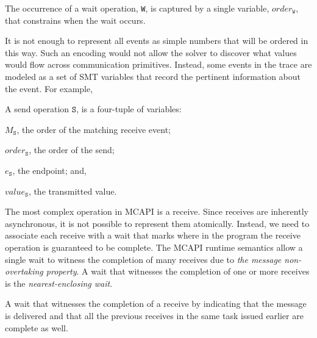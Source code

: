 \begin{definition}[Wait] \label{def:event}
The occurrence of a wait operation, \texttt{W}, is captured by a
single variable, $\mathit{order}_\mathtt{W}$, that constrains when
the wait occurs.
\end{definition}

It is not enough to represent all events as simple numbers
that will be ordered in this way.  Such an encoding would not allow the solver to
discover what values would flow across communication primitives. Instead, some events in the trace are modeled as a set of SMT
variables that record the pertinent information about the event. For
example,

\begin{definition}[Send] \label{def:snd}
A send operation $\mathtt{S}$, is a four-tuple of variables:
\begin{compactenum}
\item $M_\mathtt{S}$, the order of the matching receive event;

\item $\mathit{order}_\mathtt{S}$, the order of the send;

\item $e_\mathtt{S}$, the endpoint; and,

\item $\mathit{value}_\mathtt{S}$, the transmitted value.
\end{compactenum}
\end{definition}

The most complex operation in MCAPI is a receive. Since receives are
inherently asynchronous, it is not possible to represent them
atomically. Instead, we need to associate each receive with a wait
that marks where in the program the receive operation is guaranteed to be
complete. The MCAPI runtime semantics allow a single wait to witness the completion of many receives due to \emph{the message
  non-overtaking property}. A wait that witnesses the completion of
one or more receives is the \emph{nearest-enclosing wait}.

\begin{definition} \label{def:nw}
A wait that witnesses the completion of a receive by indicating that
the message is delivered and that all the previous receives in the
same task issued earlier are complete as well.
\end{definition}

